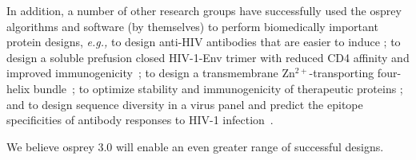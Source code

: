 In addition, a number of other research groups have successfully used the {\sc osprey} algorithms and software (by themselves) to perform biomedically important protein designs, {\em e.g.,} to design anti-HIV antibodies that are easier to induce \cite{Georgiev:2014aa}; to design a soluble prefusion closed HIV-1-Env trimer with reduced CD4 affinity and improved immunogenicity~\cite{Gwo-yu17}; to design a transmembrane Zn$^{2+}$-transporting four-helix bundle~\cite{Joh14}; to optimize stability and immunogenicity of therapeutic proteins \cite{Parker:2013aa,Salvat:2015aa,Zhao:2015aa}; and to design sequence diversity in a virus panel and predict the epitope specificities of antibody responses to HIV-1 infection~\cite{polyclonal17}.

We believe {\sc osprey} 3.0 will enable an even greater range of successful designs.  
